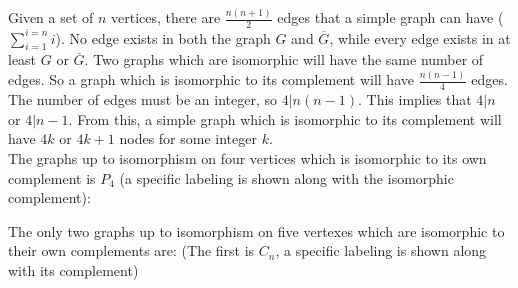 \documentclass[fontsize=11pt]{scrartcl} %
\numberwithin{equation}{section} %
\numberwithin{figure}{section} %
\numberwithin{table}{section} %
\begin{document}
			Given a set of $n$ vertices, there are $\frac{n(n+1)}{2}$ edges that a simple graph can have ($\sum_{i=1}^{i=n} i$).  No edge exists in both the graph $G$ and $\overline{G}$, while every edge exists in at least $G$ or $\overline{G}$.  Two graphs which are isomorphic will have the same number of edges.  So a graph which is isomorphic to its complement will have $\frac{n(n-1)}{4}$ edges.  \\
			
			The number of edges must be an integer, so $4|n(n-1)$.  This implies that $4|n$ or $4|n-1$.  From this, a simple graph which is isomorphic to its complement will have $4k$ or $4k+1$ nodes for some integer $k$.  \\
			
			The graphs up to isomorphism on four vertices which is isomorphic to its own complement is $P_4$ (a specific labeling is shown along with the isomorphic complement):
						
			
			
			The only two graphs up to isomorphism on five vertexes which are isomorphic to their own complements are: (The first is $C_n$, a specific labeling is shown along with its complement)
			
\end{document}
